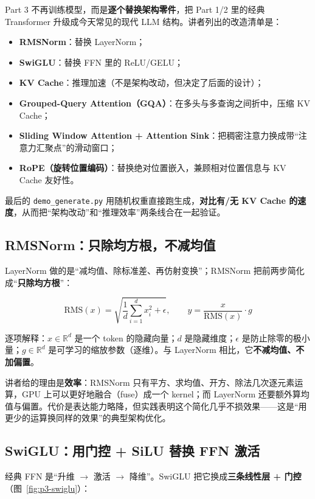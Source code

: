 Part 3 不再训练模型，而是\textbf{逐个替换架构零件}，把 Part 1/2 里的经典 Transformer 升级成今天常见的现代 LLM 结构。讲者列出的改造清单是：

\begin{itemize}
\item \textbf{RMSNorm}：替换 LayerNorm；
\item \textbf{SwiGLU}：替换 FFN 里的 ReLU/GELU；
\item \textbf{KV Cache}：推理加速（不是架构改动，但决定了后面的设计）；
\item \textbf{Grouped-Query Attention（GQA）}：在多头与多查询之间折中，压缩 KV Cache；
\item \textbf{Sliding Window Attention + Attention Sink}：把稠密注意力换成带“注意力汇聚点”的滑动窗口；
\item \textbf{RoPE（旋转位置编码）}：替换绝对位置嵌入，兼顾相对位置信息与 KV Cache 友好性。
\end{itemize}

最后的 \texttt{demo\_generate.py} 用随机权重直接跑生成，\textbf{对比有/无 KV Cache 的速度}，从而把“架构改动”和“推理效率”两条线合在一起验证。

\subsection{RMSNorm：只除均方根，不减均值}

LayerNorm 做的是“减均值、除标准差、再仿射变换”；RMSNorm 把前两步简化成“\textbf{只除均方根}”：

$$\mathrm{RMS}(x) = \sqrt{\frac{1}{d}\sum_{i=1}^{d}x_i^2 + \epsilon},\qquad y = \frac{x}{\mathrm{RMS}(x)}\cdot g$$

逐项解释：$x\in\mathbb{R}^d$ 是一个 token 的隐藏向量；$d$ 是隐藏维度；$\epsilon$ 是防止除零的极小量；$g\in\mathbb{R}^d$ 是可学习的缩放参数（逐维）。与 LayerNorm 相比，它\textbf{不减均值、不加偏置}。

讲者给的理由是\textbf{效率}：RMSNorm 只有平方、求均值、开方、除法几次逐元素运算，GPU 上可以更好地融合（fuse）成一个 kernel；而 LayerNorm 还要额外算均值与偏置。代价是表达能力略降，但实践表明这个简化几乎不损效果——这是“用更少的运算换同样的效果”的典型架构优化。

\subsection{SwiGLU：用门控 + SiLU 替换 FFN 激活}

经典 FFN 是“升维 $\rightarrow$ 激活 $\rightarrow$ 降维”。SwiGLU 把它换成\textbf{三条线性层 + 门控}（图~\ref{fig:p3-swiglu}）：

